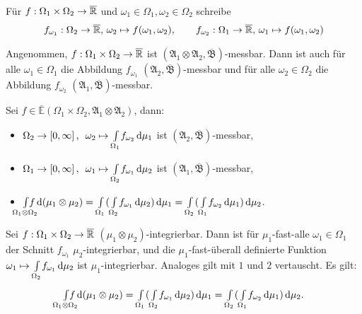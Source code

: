\documentclass{cheat-sheet}
\newcommand{\Alg}{\mathfrak{A}} %
\newcommand{\Bor}{\mathfrak{B}} %
\newcommand{\E}{\mathbb{E}} %
\theoremstyle{definition}
\begin{document}
\begin{nota}
  Für $f : \Omega_1 \times \Omega_2 \to \overline{\mathbb{R}}$ und $\omega_1 \in \Omega_1, \omega_2 \in \Omega_2$ schreibe
  \begin{align*}
    f_{\omega_1} : \Omega_2 \to \overline{\mathbb{R}}, \, \omega_2 \mapsto f(\omega_1, \omega_2), \qquad
    f_{\omega_2} : \Omega_1 \to \overline{\mathbb{R}}, \, \omega_1 \mapsto f(\omega_1, \omega_2)
  \end{align*}
\end{nota}

\begin{lem}
  Angenommen, $f : \Omega_1 \times \Omega_2 \to \overline{\mathbb{R}}$ ist $(\Alg_1 \otimes \Alg_2, \overline{\Bor})$-messbar. Dann ist auch für alle $\omega_1 \in \Omega_1$ die Abbildung $f_{\omega_1}$ $(\Alg_2, \overline{\Bor})$-messbar und für alle $\omega_2 \in \Omega_2$ die Abbildung $f_{\omega_2}$ $(\Alg_1, \overline{\Bor})$-messbar.
\end{lem}

\begin{satz}[Tonelli]
  Sei $f \in \overline{\E}(\Omega_1 \times \Omega_2, \Alg_1 \otimes \Alg_2)$, dann:
  \begin{itemize}
    \item $\Omega_2 \to \left[ 0, \infty \right], \enspace \omega_2 \mapsto {\textstyle \int\limits_{\Omega_1}^{}} f_{\omega_2} \,\mathrm{d} \mu_1$ \enspace ist $(\Alg_2, \overline{\Bor})$-messbar,
    \item $\Omega_1 \to \left[ 0, \infty \right], \enspace \omega_1 \mapsto {\textstyle \int\limits_{\Omega_2}^{}} f_{\omega_1} \,\mathrm{d} \mu_2$ \enspace ist $(\Alg_1, \overline{\Bor})$-messbar,
    \item \quad $\Int{\mathclap{\Omega_1 \otimes \Omega_2}}{}{f}{(\mu_1 \otimes \mu_2)} = \Int{\Omega_1}{}{(\Int{\Omega_2}{}{f_{\omega_1}}{\mu_2})}{\mu_1} = \Int{\Omega_2}{}{(\Int{\Omega_1}{}{f_{\omega_2}}{\mu_1})}{\mu_2}$.
  \end{itemize}
\end{satz}

\begin{satz}[Fubini]
  Sei $f : \Omega_1 \times \Omega_2 \to \overline{\mathbb{R}}$ $(\mu_1 \otimes \mu_2)$-integrierbar. Dann ist für $\mu_1$-fast-alle $\omega_1 \in \Omega_1$ der Schnitt $f_{\omega_1}$ $\mu_2$-integrierbar, und die $\mu_1$-fast-überall definierte Funktion $\omega_1 \mapsto {\textstyle \int\limits_{\Omega_2}^{}} f_{\omega_1} \,\mathrm{d} \mu_2$ ist $\mu_1$-integrierbar. Analoges gilt mit $1$ und $2$ vertauscht. Es gilt:
  \[ \Int{\mathclap{\Omega_1 \otimes \Omega_2}}{}{f}{(\mu_1 \otimes \mu_2)} = \Int{\Omega_1}{}{(\Int{\Omega_2}{}{f_{\omega_1}}{\mu_2})}{\mu_1} = \Int{\Omega_2}{}{(\Int{\Omega_1}{}{f_{\omega_2}}{\mu_1})}{\mu_2}. \]
\end{satz}
\end{document}
